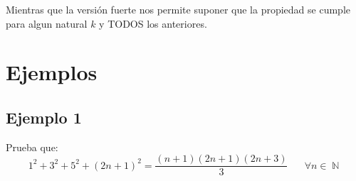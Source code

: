 \documentclass[12pt, fleqn]{report}                             %
\DeclareMathOperator \Space     {\quad}                         %
\theoremstyle{break}                                            %
\DeclareMathOperator \Naturals     {\mathbb{N}}                 %
\begin{document}
            Mientras que la versión fuerte nos permite suponer que la propiedad se cumple para algun natural
            $k$ y TODOS los anteriores.



        \clearpage
        \section{Ejemplos}


            \clearpage
            \subsection*{Ejemplo 1}

                Prueba que:
                \begin{equation*}
                    1^2 + 3^2 + 5^2 + (2n + 1)^2 = \dfrac{(n+1)(2n+1)(2n+3)}{3} \Space \forall n \in \Naturals 
                \end{equation*}
\end{document}
